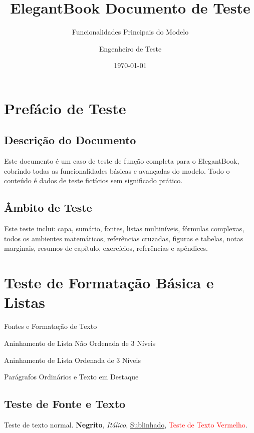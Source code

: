 \documentclass[pt]{../../elegantbook}
\title{ElegantBook Documento de Teste}
\subtitle{Funcionalidades Principais do Modelo}
\author{Engenheiro de Teste}
\institute{Equipe de Teste do Modelo}
\date{\today}
\begin{document}
\maketitle
\frontmatter
\tableofcontents

\setcounter{page}{0}
\chapter*{Prefácio de Teste}
\section*{Descrição do Documento}
Este documento é um caso de teste de função completa para o ElegantBook, cobrindo todas as funcionalidades básicas e avançadas do modelo. Todo o conteúdo é dados de teste fictícios sem significado prático.
\newpage
\section*{Âmbito de Teste}
Este teste inclui: capa, sumário, fontes, listas multiníveis, fórmulas complexas, todos os ambientes matemáticos, referências cruzadas, figuras e tabelas, notas marginais, resumos de capítulo, exercícios, referências e apêndices.

\mainmatter

\chapter{Teste de Formatação Básica e Listas}
\begin{introduction}
\item Fontes e Formatação de Texto
\item Aninhamento de Lista Não Ordenada de 3 Níveis
\item Aninhamento de Lista Ordenada de 3 Níveis
\item Parágrafos Ordinários e Texto em Destaque
\end{introduction}

\section{Teste de Fonte e Texto}
Teste de texto normal. \textbf{Negrito}, \textit{Itálico}, \underline{Sublinhado}, \textcolor{red}{Teste de Texto Vermelho}.
\end{document}
